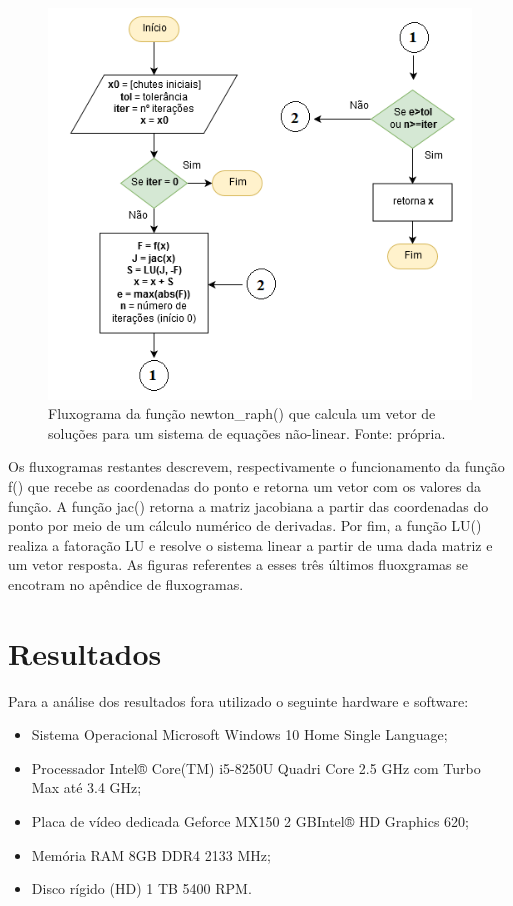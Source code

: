 \documentclass[a4paper, 12pt, openright, oneside]{article}
\begin{document}
\begin{figure}[!htb]
\centering
\includegraphics[scale=0.7]{Imagens/diag_new1.png}
\caption{Fluxograma da função newton\_raph() que calcula um vetor de soluções para um sistema de equações não-linear. Fonte: própria.}
\label{galvanometro}
\end{figure}

Os fluxogramas restantes descrevem, respectivamente o funcionamento da função f() que recebe as coordenadas do ponto e retorna um vetor com os valores da função. A função jac() retorna a matriz jacobiana a partir das coordenadas do ponto por meio de um cálculo numérico de derivadas. Por fim, a função LU() realiza a fatoração LU e resolve o sistema linear a partir de uma dada matriz e um vetor resposta. As figuras referentes a esses três últimos fluoxgramas se encotram no apêndice de fluxogramas.

\newpage

\section{Resultados}

Para a análise dos resultados fora utilizado o seguinte hardware e software:

\begin{itemize}
 \item Sistema Operacional Microsoft Windows 10 Home Single Language;
 
 \item Processador Intel® Core(TM) i5-8250U Quadri Core 2.5 GHz com Turbo Max até 3.4 GHz;
 
 \item Placa de vídeo dedicada Geforce MX150 2 GBIntel® HD Graphics 620;
 
 \item Memória RAM 8GB DDR4 2133 MHz;
 
 \item Disco rígido (HD) 1 TB 5400 RPM.
\end{itemize}
\end{document}
